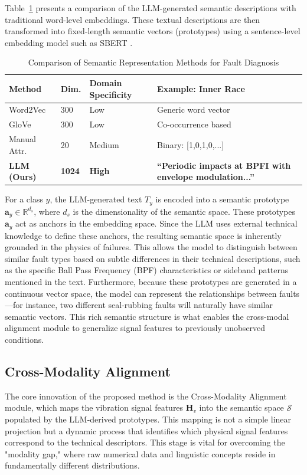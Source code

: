 \documentclass[journal]{IEEEtran}
\begin{document}
Table~\ref{tab:llm_semantics} presents a comparison of the LLM-generated semantic descriptions with traditional word-level embeddings. These textual descriptions are then transformed into fixed-length semantic vectors (prototypes) using a sentence-level embedding model such as SBERT \cite{reimers2019sentence}.

\begin{table}[!t]
\centering
\caption{Comparison of Semantic Representation Methods for Fault Diagnosis}
\label{tab:llm_semantics}
\renewcommand{\arraystretch}{1.2}
\begin{tabular}{p{1.8cm}p{1.2cm}p{1.5cm}p{2.2cm}}
\toprule
\textbf{Method} & \textbf{Dim.} & \textbf{Domain Specificity} & \textbf{Example: Inner Race} \\
\midrule
Word2Vec & 300 & Low & Generic word vector \\
GloVe & 300 & Low & Co-occurrence based \\
Manual Attr. & 20 & Medium & Binary: [1,0,1,0,...] \\
\textbf{LLM (Ours)} & \textbf{1024} & \textbf{High} & \textbf{``Periodic impacts at BPFI with envelope modulation...''} \\
\bottomrule
\end{tabular}
\end{table}

For a class $y$, the LLM-generated text $T_y$ is encoded into a semantic prototype $\mathbf{a}_y \in \mathbb{R}^{d_s}$, where $d_s$ is the dimensionality of the semantic space. These prototypes $\mathbf{a}_y$ act as anchors in the embedding space. Since the LLM uses external technical knowledge to define these anchors, the resulting semantic space is inherently grounded in the physics of failures. This allows the model to distinguish between similar fault types based on subtle differences in their technical descriptions, such as the specific Ball Pass Frequency (BPF) characteristics or sideband patterns mentioned in the text. Furthermore, because these prototypes are generated in a continuous vector space, the model can represent the relationships between faults—for instance, two different seal-rubbing faults will naturally have similar semantic vectors. This rich semantic structure is what enables the cross-modal alignment module to generalize signal features to previously unobserved conditions.

\subsection{Cross-Modality Alignment}
The core innovation of the proposed method is the Cross-Modality Alignment module, which maps the vibration signal features $\mathbf{H}_v$ into the semantic space $\mathcal{S}$ populated by the LLM-derived prototypes. This mapping is not a simple linear projection but a dynamic process that identifies which physical signal features correspond to the technical descriptors. This stage is vital for overcoming the "modality gap," where raw numerical data and linguistic concepts reside in fundamentally different distributions.
\end{document}
